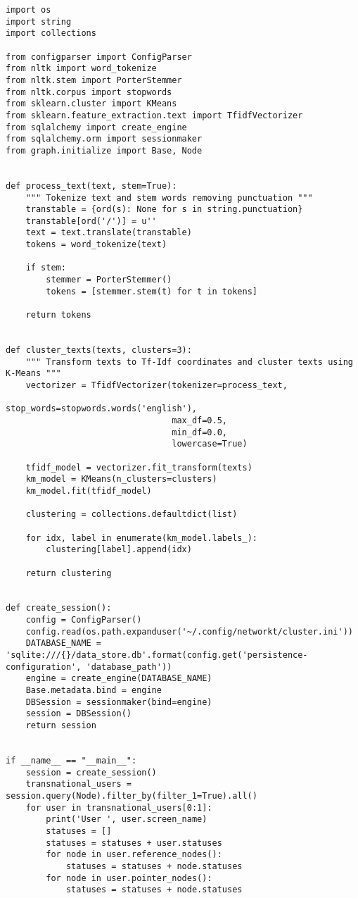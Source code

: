 \begin{lstlisting}
import os
import string
import collections

from configparser import ConfigParser
from nltk import word_tokenize
from nltk.stem import PorterStemmer
from nltk.corpus import stopwords
from sklearn.cluster import KMeans
from sklearn.feature_extraction.text import TfidfVectorizer
from sqlalchemy import create_engine
from sqlalchemy.orm import sessionmaker
from graph.initialize import Base, Node


def process_text(text, stem=True):
    """ Tokenize text and stem words removing punctuation """
    transtable = {ord(s): None for s in string.punctuation}
    transtable[ord('/')] = u''
    text = text.translate(transtable)
    tokens = word_tokenize(text)
    
    if stem:
        stemmer = PorterStemmer()
        tokens = [stemmer.stem(t) for t in tokens]
        
    return tokens


def cluster_texts(texts, clusters=3):
    """ Transform texts to Tf-Idf coordinates and cluster texts using K-Means """
    vectorizer = TfidfVectorizer(tokenizer=process_text,
                                 stop_words=stopwords.words('english'),
                                 max_df=0.5,
                                 min_df=0.0,
                                 lowercase=True)
 
    tfidf_model = vectorizer.fit_transform(texts)
    km_model = KMeans(n_clusters=clusters)
    km_model.fit(tfidf_model)
 
    clustering = collections.defaultdict(list)
 
    for idx, label in enumerate(km_model.labels_):
        clustering[label].append(idx)
 
    return clustering


def create_session():
    config = ConfigParser()
    config.read(os.path.expanduser('~/.config/networkt/cluster.ini'))
    DATABASE_NAME = 'sqlite:///{}/data_store.db'.format(config.get('persistence-configuration', 'database_path'))
    engine = create_engine(DATABASE_NAME)
    Base.metadata.bind = engine
    DBSession = sessionmaker(bind=engine)
    session = DBSession()
    return session


if __name__ == "__main__":
    session = create_session()
    transnational_users = session.query(Node).filter_by(filter_1=True).all()
    for user in transnational_users[0:1]:
        print('User ', user.screen_name)
        statuses = []
        statuses = statuses + user.statuses
        for node in user.reference_nodes():
            statuses = statuses + node.statuses
        for node in user.pointer_nodes():
            statuses = statuses + node.statuses
        

\end{lstlisting}
